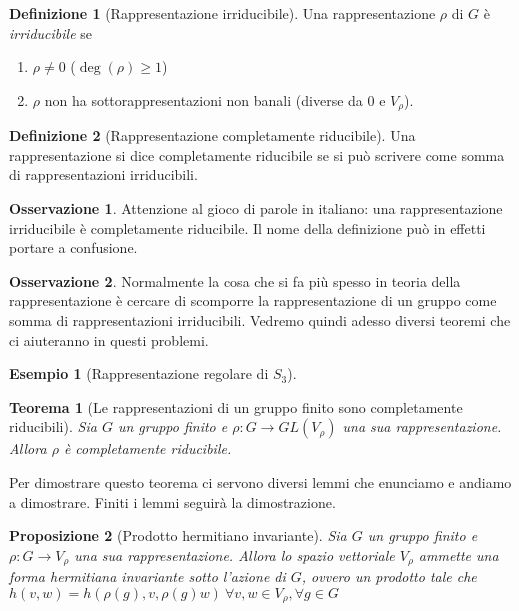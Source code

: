 \documentclass[11pt]{article}
\theoremstyle{plain}
\newtheorem{thm}{Teorema}[section]
\newtheorem{prop}[thm]{Proposizione}
\theoremstyle{definition}
\newtheorem{defn}{Definizione}[section]
\newtheorem{exmp}{Esempio}[section]
\newtheorem*{rem}{Osservazione}
\theoremstyle{remark}
\begin{document}
\begin{defn}[Rappresentazione irriducibile]
Una rappresentazione $\rho$ di $G$ è \textit{irriducibile} se
\begin{enumerate}
	\item $\rho \neq 0$ ($\deg(\rho) \geq 1$)
	\item $\rho$ non ha sottorappresentazioni non banali (diverse da 0 e $V_{\rho}$).
\end{enumerate}

\end{defn}


\begin{defn}[Rappresentazione completamente riducibile]
Una rappresentazione si dice completamente riducibile se si può scrivere come somma di rappresentazioni irriducibili.
\end{defn}


\begin{rem}
Attenzione al gioco di parole in italiano: una rappresentazione irriducibile è completamente riducibile. Il nome della definizione può in effetti portare a confusione.
\end{rem}


\begin{rem} Normalmente la cosa che si fa più spesso in teoria della rappresentazione è cercare di scomporre la rappresentazione di un gruppo come somma di rappresentazioni irriducibili. Vedremo quindi adesso diversi teoremi che ci aiuteranno in questi problemi.

\end{rem}



\begin{exmp}[Rappresentazione regolare di $S_3$]


\end{exmp}



\begin{thm}[Le rappresentazioni di un gruppo finito sono completamente riducibili]
  Sia $G$ un gruppo finito e $\rho: G \to GL(V_\rho)$ una sua rappresentazione. Allora $\rho$ è completamente riducibile.
  \label{thm:gruppo finito completamente riducibile}
\end{thm}
Per dimostrare questo teorema ci servono diversi lemmi che enunciamo e andiamo a dimostrare. Finiti i lemmi seguirà la dimostrazione.


\begin{prop}[Prodotto hermitiano invariante] Sia $G$ un gruppo finito e $\rho: G \to V_\rho$ una sua rappresentazione. Allora lo spazio vettoriale $V_\rho$ ammette una forma hermitiana invariante sotto l'azione di $G$, ovvero un prodotto tale che $h(v,w) = h(\rho(g), v, \rho(g) w) \ \forall v,w\in V_\rho, \forall g \in G$
\label{thm:esistenza hermitiana}
\end{prop}
\end{document}
